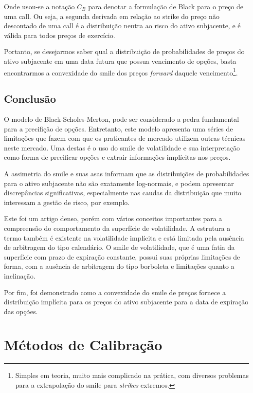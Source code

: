 \documentclass[]{book}
\let\rmarkdownfootnote\footnote%
\def\footnote{\protect\rmarkdownfootnote}
\begin{document}
Onde usou-se a notação \(C_B\) para denotar a formulação de Black para o
preço de uma call. Ou seja, a segunda derivada em relação ao strike do
preço não descontado de uma call é a distribuição neutra ao risco do
ativo subjacente, e é válida para todos preços de exercício.

Portanto, se desejarmos saber qual a distribuição de probabilidades de
preços do ativo subjacente em uma data futura que possua vencimento de
opções, basta encontrarmos a convexidade do smile dos preços
\emph{forward} daquele vencimento\footnote{Simples em teoria, muito mais
  complicado na prática, com diversos problemas para a extrapolação do
  smile para \emph{strikes} extremos.}.

\section{Conclusão}\label{conclusao}

O modelo de Black-Scholes-Merton, pode ser considerado a pedra
fundamental para a precifição de opções. Entretanto, este modelo
apresenta uma séries de limitações que fazem com que os praticantes de
mercado utilizem outras técnicas neste mercado. Uma destas é o uso do
smile de volatilidade e sua interpretação como forma de precificar
opções e extrair informações implícitas nos preços.

A assimetria do smile e suas asas informam que as distribuições de
probabilidades para o ativo subjacente não são exatamente log-normais, e
podem apresentar discrepâncias significativas, especialmente nas caudas
da distribuição que muito interessam a gestão de risco, por exemplo.

Este foi um artigo denso, porém com vários conceitos importantes para a
compreensão do comportamento da superfície de volatilidade. A estrutura
a termo também é existente na volatilidade implícita e está limitada
pela ausência de arbitragem do tipo calendário. O smile de volatilidade,
que é uma fatia da superfície com prazo de expiração constante, possui
suas próprias limitações de forma, com a ausência de arbitragem do tipo
borboleta e limitações quanto a inclinação.

Por fim, foi demonstrado como a convexidade do smile de preços fornece a
distribuição implícita para os preços do ativo subjacente para a data de
expiração das opções.

\hypertarget{calibracao}{\chapter{Métodos de
Calibração}\label{calibracao}}
\end{document}
